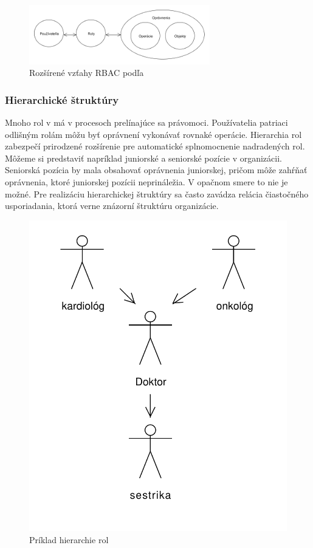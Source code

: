 \begin{figure}[H]
	\centerline{\includegraphics[width=0.7\textwidth]{images/rbac_kuhn_full}}
	\caption{Rozšírené vzťahy RBAC podľa \cite{kuhn}}
	\label{obr:rbac_kuhn_full}
\end{figure}



\subsubsection{Hierarchické štruktúry}
Mnoho rol v má v procesoch prelínajúce sa právomoci. Používatelia patriaci odlišným rolám môžu byť oprávnení vykonávať rovnaké operácie. Hierarchia rol zabezpečí prirodzené rozšírenie pre automatické splnomocnenie nadradených rol. Môžeme si predstaviť napríklad juniorské a seniorské pozície v organizácii. Seniorská pozícia by mala obsahovať oprávnenia juniorskej, pričom môže zahŕňať oprávnenia, ktoré juniorskej pozícii neprináležia.   V opačnom smere to nie je možné.  Pre realizáciu hierarchickej štruktúry sa často zavádza relácia čiastočného usporiadania, ktorá verne znázorní štruktúru organizácie. 

\begin{figure}[h]
	\centerline{\includegraphics[height=0.45\textwidth]{images/hierarchia_priklad}}
	\caption{Príklad hierarchie rol}
	\label{obr:rbac_hierarchy}
\end{figure}






